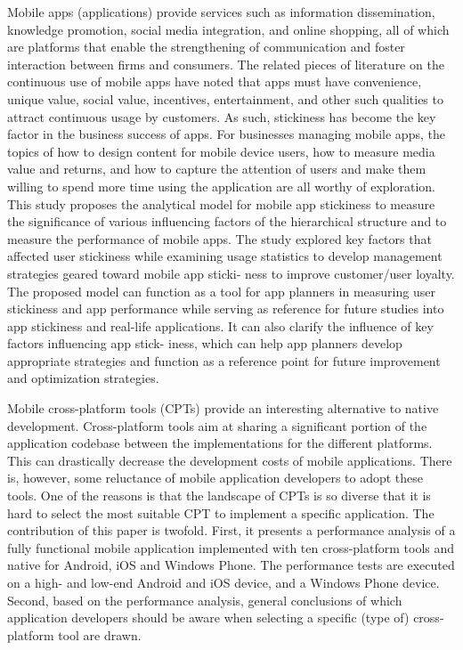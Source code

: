 \documentclass{article}
\begin{document}
\medskip

Mobile apps (applications) provide services such as information dissemination, knowledge promotion,
social media integration, and online shopping, all of which are platforms that enable the strengthening
of communication and foster interaction between firms and consumers. The related pieces of literature
on the continuous use of mobile apps have noted that apps must have convenience, unique value, social
value, incentives, entertainment, and other such qualities to attract continuous usage by customers. As
such, stickiness has become the key factor in the business success of apps. For businesses managing
mobile apps, the topics of how to design content for mobile device users, how to measure media value
and returns, and how to capture the attention of users and make them willing to spend more time using
the application are all worthy of exploration. This study proposes the analytical model for mobile app
stickiness to measure the significance of various influencing factors of the hierarchical structure and to
measure the performance of mobile apps. The study explored key factors that affected user stickiness
while examining usage statistics to develop management strategies geared toward mobile app sticki-
ness to improve customer/user loyalty. The proposed model can function as a tool for app planners in
measuring user stickiness and app performance while serving as reference for future studies into app
stickiness and real-life applications. It can also clarify the influence of key factors influencing app stick-
iness, which can help app planners develop appropriate strategies and function as a reference point for
future improvement and optimization strategies. \cite{hsu2020development}

\medskip

Mobile cross-platform tools (CPTs) provide an interesting
alternative to native development. Cross-platform tools aim
at sharing a significant portion of the application codebase
between the implementations for the different platforms.
This can drastically decrease the development costs of mobile applications. There is, however, some reluctance of mobile application developers to adopt these tools. One of the
reasons is that the landscape of CPTs is so diverse that it is
hard to select the most suitable CPT to implement a specific
application. The contribution of this paper is twofold. First,
it presents a performance analysis of a fully functional mobile application implemented with ten cross-platform tools
and native for Android, iOS and Windows Phone. The performance tests are executed on a high- and low-end Android
and iOS device, and a Windows Phone device. Second,
based on the performance analysis, general conclusions of
which application developers should be aware when selecting a specific (type of) cross-platform tool are drawn. \cite{willocx2016comparing}
\end{document}
